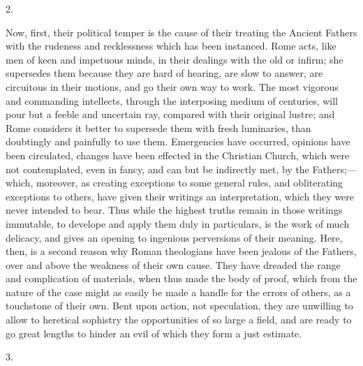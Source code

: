 2.

Now, first, their political temper is the cause of their treating
the Ancient Fathers with the rudeness and recklessness which has been
instanced. Rome acts, like men of keen and impetuous minds, in their
dealings with the old or infirm; she supersedes them because they are
hard of hearing, are slow to answer, are circuitous in their motions,
and go their own way to work. The most vigorous and commanding
intellects, through the interposing medium of centuries, will pour but
a feeble and uncertain ray, compared with their original lustre; and
Rome considers it better to supersede them with fresh luminaries,
than doubtingly and painfully to use them. Emergencies have
occurred, opinions have been circulated, changes have been effected in
the Christian Church, which were not contemplated, even in fancy, and
can but be indirectly met, by the Fathers;—which, moreover, as
creating exceptions to some general rules, and obliterating exceptions
to others, have given their writings an interpretation, which they
were never intended to bear. Thus while the highest truths remain in
those writings immutable, to develope and apply them duly in
particulars, is the work of much delicacy, and gives an opening to
ingenious perversions of their meaning. Here, then, is a second reason
why Roman theologians have been jealous of the Fathers, over and above
the weakness of their own cause. They have dreaded the range and
complication of materials, when thus made the body of proof, which
from the nature of the case might as easily be made a handle for the
errors of others, as a touchstone of their own. Bent upon action, not
speculation, they are unwilling to allow to heretical sophistry the
opportunities of so large a field, and are ready to go great lengths
to hinder an evil of which they form a just estimate.

3.

